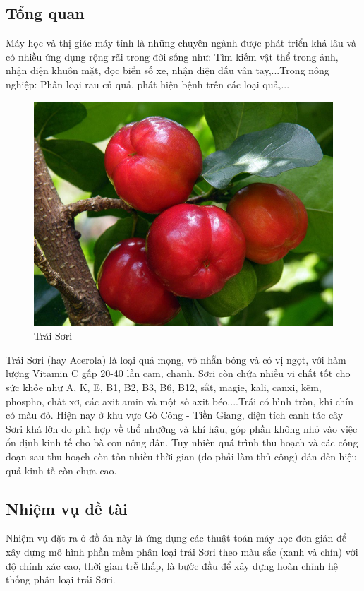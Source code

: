 \documentclass[12pt,a4paper]{article}
\begin{document}
\subsection{Tổng quan}
Máy học và thị giác máy tính là những chuyên ngành được phát triển khá lâu và có nhiều ứng dụng rộng rãi trong đời sống như: Tìm kiếm vật thể trong ảnh, nhận diện khuôn mặt, đọc biển số xe, nhận diện dấu vân tay,...Trong nông nghiệp: Phân loại rau củ quả, phát hiện bệnh trên các loại quả,...
\begin{center}
    \begin{figure}[htp]
    \begin{center}
    \includegraphics[scale=.2]{Images/sori}
    \end{center}
    \caption{Trái Sơri}
    \end{figure}
\end{center}
Trái Sơri (hay Acerola) là loại quả mọng, vỏ nhẵn bóng và có vị ngọt, với hàm lượng Vitamin C gấp 20-40 lần cam, chanh. Sơri còn chứa nhiều vi chất tốt cho sức khỏe như A, K, E, B1, B2, B3, B6, B12, sắt, magie, kali, canxi, kẽm, phospho, chất xơ, các axit amin và một số axit béo....Trái có hình tròn, khi chín có màu đỏ. Hiện nay ở khu vực Gò Công - Tiền Giang, diện tích canh tác cây Sơri khá lớn do phù hợp về thổ nhưỡng và khí hậu, góp phần không nhỏ vào việc ổn định kinh tế cho bà con nông dân. Tuy nhiên quá trình thu hoạch và các công đoạn sau thu hoạch còn tốn nhiều thời gian (do phải làm thủ công) dẫn đến hiệu quả kinh tế còn chưa cao.
\subsection{Nhiệm vụ đề tài}
Nhiệm vụ đặt ra ở đồ án này là ứng dụng các thuật toán máy học đơn giản để xây dựng mô hình phần mềm phân loại trái Sơri theo màu sắc (xanh và chín) với độ chính xác cao, thời gian trễ thấp, là bước đầu để xây dựng hoàn chỉnh hệ thống phân loại trái Sơri. 
\end{document}
